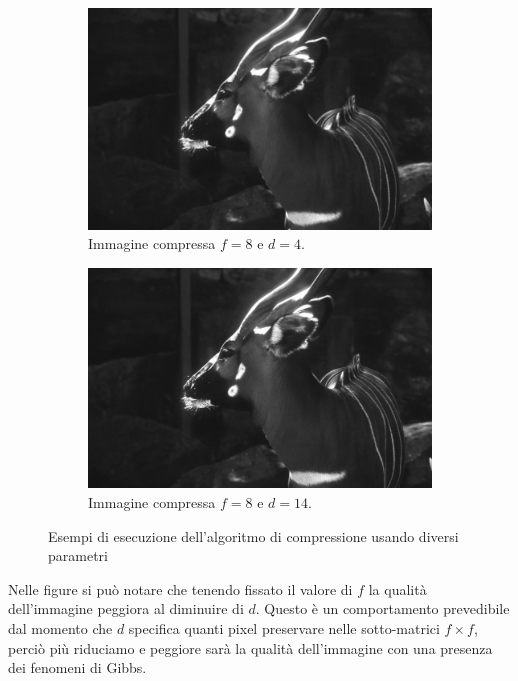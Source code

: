 \begin{figure}[!ht]
\begin{subfigure}[!ht]{0.45\textwidth}
        \includegraphics[width=\textwidth]{Progetto_2/img/gui_compressed.png}
        \caption{Immagine compressa $f = 8$ e $d = 4$.}
    \end{subfigure}
    \begin{subfigure}[!ht]{0.45\textwidth}
        \includegraphics[width=\textwidth]{Progetto_2/img/gui_compressed14.png}
        \caption{Immagine compressa $f = 8$ e $d = 14$.}
    \end{subfigure}
    \caption{Esempi di esecuzione dell'algoritmo di compressione usando diversi 
    parametri}
    \label{fig:compress}
\end{figure}

Nelle figure si può notare che tenendo fissato il valore di $f$ la qualità dell'immagine 
peggiora al diminuire di $d$. Questo è un comportamento prevedibile dal momento 
che $d$ specifica quanti pixel preservare nelle sotto-matrici $f\times f$, perciò
più riduciamo e peggiore sarà la qualità dell'immagine con una presenza dei fenomeni 
di Gibbs.

